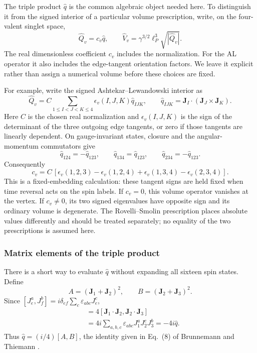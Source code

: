 The triple product $\hat q$ is the common algebraic object needed here.
To distinguish it from the signed interior of a particular volume
prescription, write, on the four-valent singlet space,
\begin{equation}\label{eqn:Q-singlet}
 \hat Q_v=c_v\hat q,\qquad
 \hat V_v=\gamma^{3/2}\ell_P^3\sqrt{|\hat Q_v|}.
\end{equation}
The real dimensionless coefficient $c_v$ includes the normalization.
For the AL operator it also includes the edge-tangent orientation factors.
We leave it explicit rather than assign a numerical volume before these
choices are fixed.

For example, write the signed Ashtekar--Lewandowski interior as
\begin{equation}
 \hat Q_v=C\sum_{1\leq I<J<K\leq4}\epsilon_v(I,J,K)\hat q_{IJK},
 \qquad \hat q_{IJK}=\mathbf J_I\cdot(\mathbf J_J\times\mathbf J_K).
\end{equation}
Here $C$ is the chosen real normalization and $\epsilon_v(I,J,K)$ is the
sign of the determinant of the three outgoing edge tangents, or zero if
those tangents are linearly dependent. On gauge-invariant states, closure
and the angular-momentum commutators give
\begin{equation}
 \hat q_{124}=-\hat q_{123},\qquad
 \hat q_{134}=\hat q_{123},\qquad
 \hat q_{234}=-\hat q_{123}.
\end{equation}
Consequently
\begin{equation}
 c_v=C\,[\epsilon_v(1,2,3)-\epsilon_v(1,2,4)
          +\epsilon_v(1,3,4)-\epsilon_v(2,3,4)].
\end{equation}
This is a fixed-embedding calculation: these tangent signs are held fixed
when time reversal acts on the spin labels. If $c_v=0$, this volume
operator vanishes at the vertex. If $c_v\ne0$, its two signed eigenvalues
have opposite sign and its ordinary volume is degenerate. The
Rovelli--Smolin prescription places absolute values differently and should
be treated separately; no equality of the two prescriptions is assumed here.



\subsubsection{Matrix elements of the triple product}

There is a short way to evaluate $\hat q$ without expanding all sixteen
spin states. Define
\begin{equation}
 A=(\mathbf J_1+\mathbf J_2)^2,\qquad
 B=(\mathbf J_2+\mathbf J_3)^2.
\end{equation}
Since $[J_e^a,J_f^b]=i\delta_{ef}\sum_c\varepsilon_{abc}J_e^c$,
\begin{align}
 [A,B]&=4[\mathbf J_1\cdot\mathbf J_2,\mathbf J_2\cdot\mathbf J_3]
 \nonumber\\
 &=4i\sum_{a,b,c}\varepsilon_{abc}J_1^aJ_2^cJ_3^b
 =-4i\hat q.
\end{align}
Thus $\hat q=(i/4)[A,B]$, the identity given in
Eq.~(8) of Brunnemann and Thiemann \cite{Brunnemann2006Simplification}.

